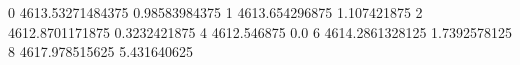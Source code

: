 0 4613.53271484375 0.98583984375
1 4613.654296875 1.107421875
2 4612.8701171875 0.3232421875
4 4612.546875 0.0
6 4614.2861328125 1.7392578125
8 4617.978515625 5.431640625
